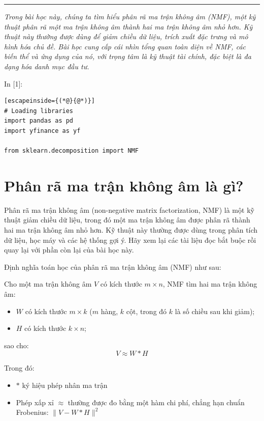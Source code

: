 \begin{center}\rule{0.5\linewidth}{0.5pt}\end{center}

\emph{Trong bài học này, chúng ta tìm hiểu phân rã ma trận không âm (NMF), một kỹ thuật phân rã một ma trận không âm thành hai ma trận không âm nhỏ hơn. Kỹ thuật này thường được dùng để giảm chiều dữ liệu, trích xuất đặc trưng và mô hình hóa chủ đề. Bài học cung cấp cái nhìn tổng quan toàn diện về NMF, các biến thể và ứng dụng của nó, với trọng tâm là kỹ thuật tài chính, đặc biệt là đa dạng hóa danh mục đầu tư.}

In {[}1{]}:

\begin{lstlisting}[escapeinside={(*@}{@*)}]
# Loading libraries
import pandas as pd
import yfinance as yf

from sklearn.decomposition import NMF
\end{lstlisting}

\section{Phân rã ma trận không âm là gì?}

Phân rã ma trận không âm (non-negative matrix factorization, NMF) là một kỹ thuật giảm chiều dữ liệu, trong đó một ma trận không âm được phân rã thành hai ma trận không âm nhỏ hơn. Kỹ thuật này thường được dùng trong phân tích dữ liệu, học máy và các hệ thống gợi ý. Hãy xem lại các tài liệu đọc bắt buộc rồi quay lại với phần còn lại của bài học này.

Định nghĩa toán học của phân rã ma trận không âm (NMF) như sau:

Cho một ma trận không âm \(V\) có kích thước \(m \times n\), NMF tìm hai ma trận không âm:

\begin{itemize}
\item
  \(W\) có kích thước \(m \times k\) (\(m\) hàng, \(k\) cột, trong đó \(k\) là số chiều sau khi giảm);
\item
  \(H\) có kích thước \(k \times n\);
\end{itemize}

sao cho: \[
V \approx W * H
\]

Trong đó:

\begin{itemize}
\item
  \(*\) ký hiệu phép nhân ma trận
\item
  Phép xấp xỉ \(\approx\) thường được đo bằng một hàm chi phí, chẳng hạn chuẩn Frobenius: \(\lVert V - W * H \rVert ^2\)
\end{itemize}

